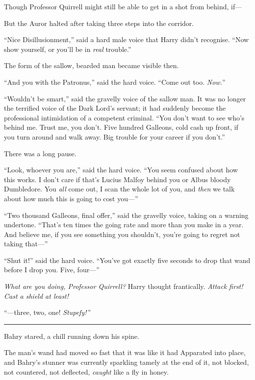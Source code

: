 Though Professor Quirrell might still be able to get in a shot from
behind, if---

But the Auror halted after taking three steps into the corridor.

``Nice Disillusionment,'' said a hard male voice that Harry didn't
recognise. ``Now show yourself, or you'll be in \emph{real} trouble.''

The form of the sallow, bearded man became visible then.

``And you with the Patronus,'' said the hard voice. ``Come out too.
\emph{Now.}''

``Wouldn't be smart,'' said the gravelly voice of the sallow man. It was
no longer the terrified voice of the Dark Lord's servant; it had
suddenly become the professional intimidation of a competent criminal.
``You don't want to see who's behind me. Trust me, you don't. Five
hundred Galleons, cold cash up front, if you turn around and walk away.
Big trouble for your career if you don't.''

There was a long pause.

``Look, whoever you are,'' said the hard voice. ``You seem confused
about how this works. I don't care if that's Lucius Malfoy behind you or
Albus bloody Dumbledore. You \emph{all} come out, I scan the whole lot
of you, and \emph{then} we talk about how much this is going to cost
you---''

``Two thousand Galleons, final offer,'' said the gravelly voice, taking
on a warning undertone. ``That's ten times the going rate and more than
you make in a year. And believe me, if you see something you shouldn't,
you're going to regret not taking that---''

``Shut it!'' said the hard voice. ``You've got exactly five seconds to
drop that wand before I drop you. Five, four---''

\emph{What are you doing, Professor Quirrell?} Harry thought
frantically. \emph{Attack first! Cast a shield at least!}

``---three, two, one! \emph{Stupefy!''}

\begin{center}\rule{3in}{0.4pt}\end{center}

Bahry stared, a chill running down his spine.

The man's wand had moved so fast that it was like it had Apparated into
place, and Bahry's stunner was currently sparkling tamely at the end of
it, not blocked, not countered, not deflected, \emph{caught} like a fly
in honey.

